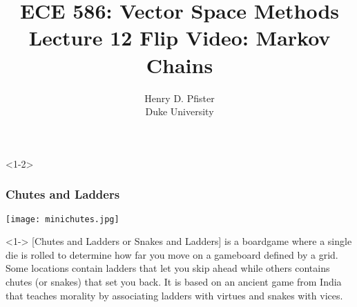\documentclass[10pt,english,aspectratio=169]{beamer}
\begin{document}
\title{ECE 586: Vector Space Methods \\ Lecture 12 Flip Video: Markov Chains}
\author{Henry D. Pfister \\ Duke University}
\date{}


\begin{frame}[plain]
	\titlepage
	
\end{frame}

\addtocounter{framenumber}{-1}


\begin{frame}<1-2> \frametitle{Chutes and Ladders}

\vspace{-3mm}

\begin{center}
\texttt{[image: minichutes.jpg]}
\end{center}
\vspace{-4mm}

\begin{example}<1-> [Chutes and Ladders or Snakes and Ladders]
 is a boardgame where a single die is rolled to determine how far you move on a gameboard defined by a grid. Some locations contain ladders that let you skip ahead while others contains chutes (or snakes) that set you back. It is based on an ancient game from India that teaches morality by associating ladders with virtues and snakes with vices.
\end{example}


\vspace{-1mm}


\end{frame}
\end{document}
